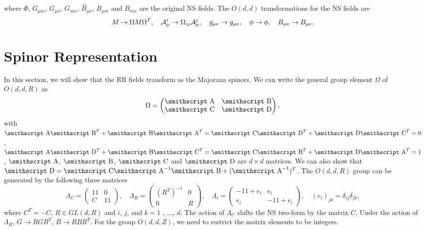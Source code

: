 \documentclass[a4paper,12pt]{article}
\newcommand{\mathst}[1]{\mbox{\smithscript #1}}
\begin{document}
where $\Phi$, $G_{\mu m}$, $G_{\mu\nu}$, 
$G_{mn}$, $\hat B_{\mu\nu}$, $B_{\mu m}$ and $B_{mn}$
are the original NS fields.
The $O(d,d)$ transformations for the NS fields are
\begin{equation}
M \to \Omega M \Omega^T ,\ \ \ {\cal A}^i_{\mu} \to \Omega_{ij}
{\cal A}^j_{\mu}, \ \ \ g_{\mu\nu} \to g_{\mu\nu}, \ \ \
\phi \to \phi, \ \ \ B_{\mu\nu} \to B_{\mu\nu}.
\label{tdual}
\end{equation}

\section{Spinor Representation}

In this section, we will show that the RR fields transform
as the Majorana spinors.
We can write the general group element $\Omega$ of $O(d,d,R)$
as
\begin{equation}
\Omega=\begin{pmatrix}
{\mathst A} & {\mathst B}\\
{\mathst C} & {\mathst D}
\end{pmatrix},
\end{equation}
with ${\mathst A}{\mathst B}^T+{\mathst B}{\mathst A}^T=
{\mathst C}{\mathst D}^T+{\mathst D}{\mathst C}^T=0$,
${\mathst A}{\mathst D}^T+{\mathst B}{\mathst C}^T=
{\mathst C}{\mathst B}^T+{\mathst D}{\mathst A}^T=1$,
${\mathst A}$, ${\mathst B}$, ${\mathst C}$ and
${\mathst D}$ are $d\times d$ matrices. We can also
show that ${\mathst D}={\mathst C}{\mathst A}^{-1}
{\mathst B}+({\mathst A}^{-1})^T$. The $O(d,d,R)$
group can be generated by the following three
matrices \cite{giveon94}
\begin{equation}
\Lambda_C=\begin{pmatrix}
1\!\!1& 0\\
C & 1\!\!1
\end{pmatrix},\quad
\Lambda_R=\begin{pmatrix}
(R^T)^{-1} & 0\\
0 & R
\end{pmatrix},\quad
\Lambda_i=\begin{pmatrix}
-1\!\!1 + e_i & e_i\\
e_i & -1\!\!1 +e_i
\end{pmatrix},\quad
(e_i)_{jk}=\delta_{ij}\delta_{jk},
\end{equation}
where $C^T=-C$, $R\in GL(d,R)$ and $i$, $j$, and $k=1$ ,
$\dots$, $d$. The action of $\Lambda_C$ shifts
the NS two-form by the matrix $C$. Under the action
of $\Lambda_R$, $G\rightarrow RGR^T$, $B\rightarrow
RBR^T$.
For the group $O(d,d,Z)$, we need to restrict
the matrix elements to be integers.
\end{document}
